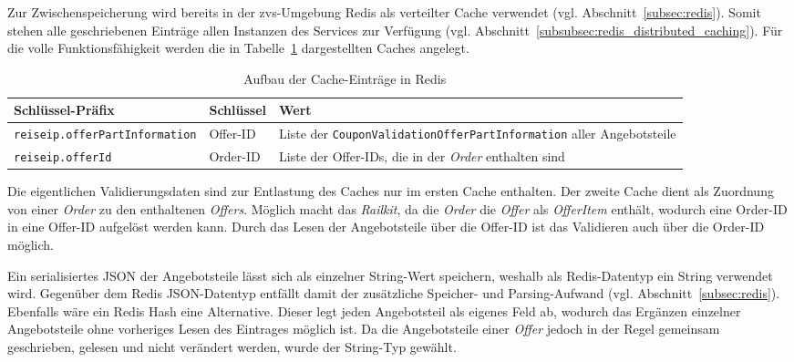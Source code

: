 Zur Zwischenspeicherung wird bereits in der \ac{zvs}-Umgebung Redis als verteilter Cache verwendet (vgl. Abschnitt~\ref{subsec:redis}). Somit stehen alle geschriebenen Einträge allen Instanzen des Services zur Verfügung (vgl. Abschnitt~\ref{subsubsec:redis_distributed_caching}). Für die volle Funktionsfähigkeit werden die in Tabelle~\ref{tab:schluessel} dargestellten Caches angelegt.

\begin{table}[htbp]
    \centering
    \begin{tabular}{p{} p{} p{}}
        \hline
        \textbf{Schlüssel-Präfix} & \textbf{Schlüssel} & \textbf{Wert} \\
        \hline
        \texttt{reiseip.offerPartInformation} & Offer-ID & Liste der \texttt{CouponValidationOfferPartInformation} aller Angebotsteile \\
        \texttt{reiseip.offerId} & Order-ID & Liste der Offer-IDs, die in der \textit{Order} enthalten sind \\
        \hline
    \end{tabular}
    \caption{Aufbau der Cache-Einträge in Redis}
    \label{tab:schluessel}
\end{table}

Die eigentlichen Validierungsdaten sind zur Entlastung des Caches nur im ersten Cache enthalten. Der zweite Cache dient als Zuordnung von einer \textit{Order} zu den enthaltenen \textit{Offers}. Möglich macht das \textit{Railkit}, da die \textit{Order} die \textit{Offer} als \textit{OfferItem} enthält, wodurch eine Order-ID in eine Offer-ID aufgelöst werden kann. Durch das Lesen der Angebotsteile über die Offer-ID ist das Validieren auch über die Order-ID möglich.

Ein serialisiertes JSON der Angebotsteile lässt sich als einzelner String-Wert speichern, weshalb als Redis-Datentyp ein String verwendet wird. %
Gegenüber dem Redis JSON-Datentyp entfällt damit der zusätzliche Speicher- und Parsing-Aufwand (vgl. Abschnitt~\ref{subsec:redis}). Ebenfalls wäre ein Redis Hash eine Alternative. Dieser legt jeden Angebotsteil als eigenes Feld ab, wodurch das Ergänzen einzelner Angebotsteile ohne vorheriges Lesen des Eintrages möglich ist. Da die Angebotsteile einer \textit{Offer} jedoch in der Regel gemeinsam geschrieben, gelesen und nicht verändert werden, wurde der String-Typ gewählt.

